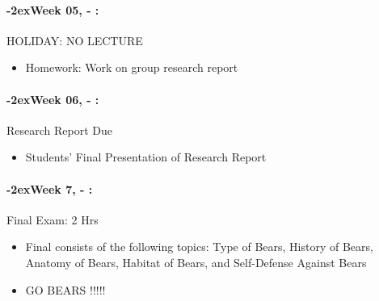 \documentclass[11pt]{article}
\newcommand{\week}[1]{%
  \paragraph*{\kern-2ex\quad #1, \syldate{\today} - \AdvanceDate[4]\syldate{\today}:}%
  \ifdim\wd1=\wd\MONDAY
    \AdvanceDate[7]
  \else
    \AdvanceDate[7]
  \fi%
}
\begin{document}
\week{Week 05} HOLIDAY: NO LECTURE
\begin{itemize}
\item Homework: Work on group research report
\end{itemize}

\week{Week 06} Research Report Due
\begin{itemize}
\item Students' Final Presentation of Research Report
\end{itemize}


\week{Week 7} Final Exam: 2 Hrs
\begin{itemize}
\item Final consists of the following topics:
 Type of Bears, History of Bears, Anatomy of Bears, Habitat of Bears, and Self-Defense Against Bears
 \item GO BEARS !!!!!
\end{itemize}
\end{document}
